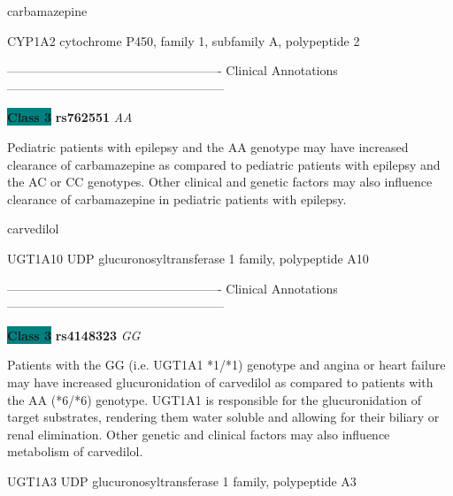 \documentclass{resume} %
\begin{document}
\begin{rSection}{ carbamazepine }
\begin{rSubsection}{ CYP1A2 }{ cytochrome P450, family 1, subfamily A, polypeptide 2 }{}{}
\item[] ---------------------------------------------------- Clinical Annotations -----------------------------------------------------\newline
\item \textbf{\colorbox{teal} {Class 3}} \textbf{ rs762551 } \textit{ AA }
\item[] Pediatric patients with epilepsy and the AA genotype may have increased clearance of carbamazepine as compared to pediatric patients with epilepsy and the AC or CC genotypes. Other clinical and genetic factors may also influence clearance of carbamazepine in pediatric patients with epilepsy.
\end{rSubsection}

\end{rSection}\begin{rSection}{ carvedilol }
\item[]

\begin{rSubsection}{ UGT1A10 }{ UDP glucuronosyltransferase 1 family, polypeptide A10 }{}{}
\item[]

\item[] ---------------------------------------------------- Clinical Annotations -----------------------------------------------------\newline
\item \textbf{\colorbox{teal} {Class 3}} \textbf{ rs4148323 } \textit{ GG }
\item[] Patients with the GG (i.e. UGT1A1 *1/*1) genotype and angina or heart failure may have increased glucuronidation of carvedilol as compared to patients with the AA (*6/*6) genotype. UGT1A1 is responsible for the glucuronidation of target substrates, rendering them water soluble and allowing for their biliary or renal elimination. Other genetic and clinical factors may also influence metabolism of carvedilol.
\end{rSubsection}\begin{rSubsection}{ UGT1A3 }{ UDP glucuronosyltransferase 1 family, polypeptide A3 }{}{}
\item[]


\end{rSubsection}
\end{rSection}
\end{document}
